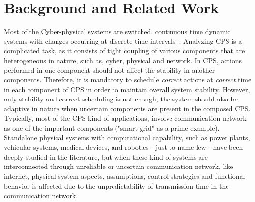 \section{Background and Related Work}
\label{sec:related_work}

Most of the Cyber-physical systems are switched, continuous time dynamic systems with changes occurring at discrete time intervals~\cite{liberzon03}. Analyzing CPS is a complicated task, as it consists of tight coupling of various components that are heterogeneous in nature, such as, cyber,  physical and network. In CPS, actions performed in one component should not affect the stability in another components. Therefore, it is mandatory to schedule \textit{correct} actions at \textit{correct} time in each component of CPS in order to maintain overall system stability. However, only stability and correct scheduling is not enough, the system should also be adaptive in nature when uncertain components are present in the composed CPS. Typically, most of the CPS kind of applications, involve communication network as one of the important components ("smart grid" as a prime example). Standalone physical systems with computational capability, such as power plants, vehicular systems, medical devices, and robotics - just to name few - have been deeply studied in the literature, but when these kind of systems are interconnected through unreliable or uncertain communication network, like internet, physical system aspects, assumptions, control strategies and functional behavior is affected due to the unpredictability of transmission time in the communication network. 

